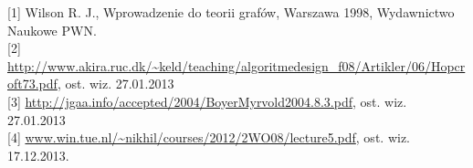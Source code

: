 \documentclass[a4 122pt]{article}
\begin{document}
	[1]	Wilson R. J., Wprowadzenie do teorii grafów, Warszawa 1998, Wydawnictwo Naukowe PWN.\\[0.3cm]
	[2]	\url{http://www.akira.ruc.dk/~keld/teaching/algoritmedesign\_f08/Artikler/06/Hopcroft73.pdf}, ost. wiz. 27.01.2013\\[0.3cm] 
	[3]	\url{http://jgaa.info/accepted/2004/BoyerMyrvold2004.8.3.pdf}, ost. wiz. 27.01.2013 \\[0.3cm]
	[4]	\url{www.win.tue.nl/~nikhil/courses/2012/2WO08/lecture5.pdf}, ost. wiz. 17.12.2013.\\[0.3cm]
\end{document}

